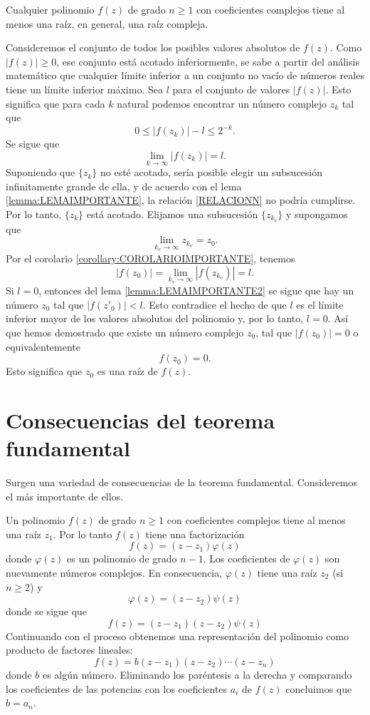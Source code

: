 \begin{theorem}{}{}
     Cualquier polinomio $f(z)$ de grado $n \geq 1$ con coeficientes complejos tiene al menos una raíz, en general, una raíz compleja.

    \tcblower
    \demostracion Consideremos el conjunto de todos los posibles valores absolutos de $f(z)$. Como $|f(z)| \geq 0$, ese conjunto está acotado inferiormente, se sabe a partir del análisis matemático que cualquier límite inferior a un conjunto no vacío de números reales tiene un límite inferior máximo. Sea $l$ para el conjunto de valores $|f(z)|$. Esto significa que para cada $k$ natural podemos encontrar un número complejo $z_k$ tal que
    $$0 \leq |f(z_k)| - l \leq 2^{-k}.$$
    Se sigue que
    \begin{equation}
        \lim_{k \rightarrow \infty} |f(z_k)|=l. \label{RELACIONN}
    \end{equation}
    Suponiendo que $\{z_k\}$ no esté acotado, sería posible elegir un subsucesión infinitamente grande de ella, y de acuerdo con el lema \ref{lemma:LEMAIMPORTANTE}, la relación \eqref{RELACIONN} no podría cumplirse. Por lo tanto, $\{z_k\}$ está acotado. Elijamos una subsucesión $\{z_{k_v}\}$ y supongamos que
    $$\lim_{k_v \rightarrow \infty} z_{k_v} = z_0.$$
    Por el corolario \ref{corollary:COROLARIOIMPORTANTE}, tenemos
    $$|f(z_0)| = \lim_{k_v \rightarrow \infty} |f(z_{k_v})|=l.$$
    Si $l=0$, entonces del lema \ref{lemma:LEMAIMPORTANTE2} se sigue que hay un número $z_0$ tal que $|f(z'_0)|<l$. Esto contradice el hecho de que $l$ es el límite inferior mayor de los valores absolutos del polinomio y, por lo tanto, $l=0$. Así que hemos demostrado que existe un número complejo $z_0$, tal que $|f(z_0)|=0$ o equivalentemente
    $$f(z_0)=0.$$
    Esto significa que $z_0$ es una raíz de $f(z)$.
\end{theorem}

\section{Consecuencias del teorema fundamental}

Surgen una variedad de consecuencias de la teorema fundamental. Consideremos el más importante de ellos.

Un polinomio $f(z)$ de grado $n \geq 1$ con coeficientes complejos tiene al menos una raíz $z_1$. Por lo tanto $f(z)$ tiene una factorización
$$f(z)=(z-z_1) \varphi (z)$$
donde $\varphi(z)$ es un polinomio de grado $n - 1$. Los coeficientes de $\varphi(z)$ son nuevamente números complejos. En consecuencia, $\varphi(z)$ tiene una raíz $z_2$ (si $n \geq 2$) y
$$\varphi (z) = (z-z_2) \psi (z)$$
donde se sigue que
$$f(z) = (z-z_1)(z-z_2) \psi (z)$$
Continuando con el proceso obtenemos una representación del polinomio como producto de factores lineales:
$$f(z) = b (z-z_1)(z-z_2) \cdots (z-z_n)$$
donde $b$ es algún número. Eliminando los paréntesis a la derecha y comparando los coeficientes de las potencias con los coeficientes $a_i$ de $f(z)$ concluimos que $b = a_n$.


